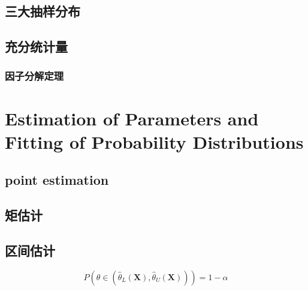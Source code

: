 \documentclass{report}
\begin{document}
\section{三大抽样分布}
\section{充分统计量}
\subsection{因子分解定理}
\chapter{Estimation of Parameters	and Fitting of Probability	Distributions}
\section{point estimation}
\section{矩估计}
\section{区间估计}
$$P\left(\theta \in\left(\hat{\theta}_{L}(\mathbf{X}), \hat{\theta}_{U}(\mathbf{X})\right)\right)=1-\alpha$$
\end{document}
